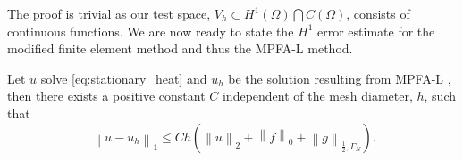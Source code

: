 \documentclass[../Main/main.tex]{subfiles}
\begin{document}
The proof is trivial as our test space, $V_h \subset H^1(\Omega)\bigcap C(\Omega)$, consists of continuous functions.
	We are now ready to state the $H^1$ error estimate for the modified finite element method and thus the MPFA-L method.
	\begin{theorem}\label{th:convergence of elliptic}
		Let $u$ solve \eqref{eq:stationary_heat} and $u_h$ be the solution resulting from MPFA-L , then there exists a positive constant $C$ independent of the mesh diameter, $h$, such that
		\begin{equation}\
			\left \|u - u_h \right \|_1 \leq C h (\left \| u \right \|_2 + \left \| f \right \|_0 + \left \| g \right \|_{\frac{1}{2},\Gamma_N}).
		\end{equation}
	\end{theorem}
\end{document}
